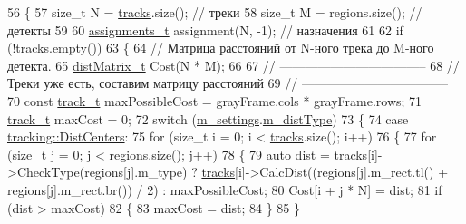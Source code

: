 \begin{DoxyCode}
56 \{
57     \textcolor{keywordtype}{size\_t} N = \mbox{\hyperlink{class_c_tracker_a86d322bc042985711c8d5ec8b9614230}{tracks}}.size();     \textcolor{comment}{// треки}
58     \textcolor{keywordtype}{size\_t} M = regions.size();  \textcolor{comment}{// детекты}
59 
60     \mbox{\hyperlink{_hungarian_alg_8h_ad7b9f569a9adbd958c668a36b6884ffd}{assignments\_t}} assignment(N, -1); \textcolor{comment}{// назначения}
61 
62     \textcolor{keywordflow}{if} (!\mbox{\hyperlink{class_c_tracker_a86d322bc042985711c8d5ec8b9614230}{tracks}}.empty())
63     \{
64         \textcolor{comment}{// Матрица расстояний от N-ного трека до M-ного детекта.}
65         \mbox{\hyperlink{_hungarian_alg_8h_af6ab0ee8259a51215f62e8f96416d5bb}{distMatrix\_t}} Cost(N * M);
66 
67         \textcolor{comment}{// -----------------------------------}
68         \textcolor{comment}{// Треки уже есть, составим матрицу расстояний}
69         \textcolor{comment}{// -----------------------------------}
70         \textcolor{keyword}{const} \mbox{\hyperlink{defines_8h_a7ce9c8817b42ab418e61756f579549ab}{track\_t}} maxPossibleCost = grayFrame.cols * grayFrame.rows;
71         \mbox{\hyperlink{defines_8h_a7ce9c8817b42ab418e61756f579549ab}{track\_t}} maxCost = 0;
72         \textcolor{keywordflow}{switch} (\mbox{\hyperlink{class_c_tracker_acb84aee0d550f4cdadbfac6735811050}{m\_settings}}.\mbox{\hyperlink{struct_tracker_settings_a2633bd68c2d482a666a5d4bba580cca0}{m\_distType}})
73         \{
74         \textcolor{keywordflow}{case} \mbox{\hyperlink{namespacetracking_a55743c5e18b9b228c4ba2587260b2502a30176bdc0b4f965c6812767a2fa52e1e}{tracking::DistCenters}}:
75             \textcolor{keywordflow}{for} (\textcolor{keywordtype}{size\_t} i = 0; i < \mbox{\hyperlink{class_c_tracker_a86d322bc042985711c8d5ec8b9614230}{tracks}}.size(); i++)
76             \{
77                 \textcolor{keywordflow}{for} (\textcolor{keywordtype}{size\_t} j = 0; j < regions.size(); j++)
78                 \{
79                     \textcolor{keyword}{auto} dist = \mbox{\hyperlink{class_c_tracker_a86d322bc042985711c8d5ec8b9614230}{tracks}}[i]->CheckType(regions[j].m\_type) ? 
      \mbox{\hyperlink{class_c_tracker_a86d322bc042985711c8d5ec8b9614230}{tracks}}[i]->CalcDist((regions[j].m\_rect.tl() + regions[j].m\_rect.br()) / 2) : maxPossibleCost;
80                     Cost[i + j * N] = dist;
81                     \textcolor{keywordflow}{if} (dist > maxCost)
82                     \{
83                         maxCost = dist;
84                     \}
85                 \}

\end{DoxyCode}
